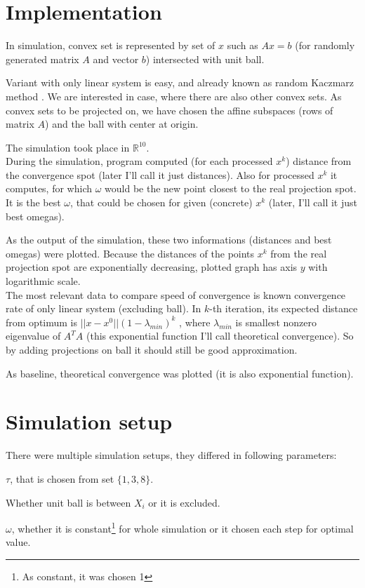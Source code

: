 \documentclass[11pt]{book}
\newcommand{\R}{\mathbb{R}}
\begin{document}
\section{Implementation}

In simulation, convex set is represented by set of $x$ such as $Ax=b$ (for randomly generated matrix $A$ and vector $b$) intersected with unit ball.

Variant with only linear system is easy, and already known as random Kaczmarz method \cite{kaczmarz, iterativeLinearSystems}. We are interested in case, where there are also other convex sets. As convex sets to be projected on, we have chosen the affine subspaces (rows of matrix $A$) and the ball with center at origin.

The simulation took place in $\R^{10}$.\\

During the simulation, program computed (for each processed $x^k$) distance from the convergence spot (later I'll call it just distances). Also for processed $x^k$ it computes, for which $\omega$ would be the new point closest to the real projection spot. It is the best $\omega$, that could be chosen for given (concrete) $x^k$ (later, I'll call it just best omegas).

As the output of the simulation, these two informations (distances and best omegas) were plotted. Because the distances of the points $x^k$ from the real projection spot are exponentially decreasing, plotted graph has axis $y$ with logarithmic scale.\\

The most relevant data to compare speed of convergence is known convergence rate of only linear system (excluding ball). In $k$-th iteration, its expected distance from optimum is $||x-x^0||(1-\lambda_{min})^k$ \cite{kaczmarz}, where $\lambda_{min}$ is smallest nonzero eigenvalue of $A^TA$ (this exponential function I'll call theoretical convergence). So by adding projections on ball it should still be good approximation.

As baseline, theoretical convergence was plotted (it is also exponential function).

\section{Simulation setup}

There were multiple simulation setups, they differed in following parameters:

\begin{list}{•}{}
	\item $\tau$, that is chosen from set $\{ 1, 3, 8 \}$.
	\item Whether unit ball is between $X_i$ or it is excluded.
	\item $\omega$, whether it is constant\footnote{As constant, it was chosen 1} for whole simulation or it chosen each step for optimal value.
\end{list}
\end{document}
